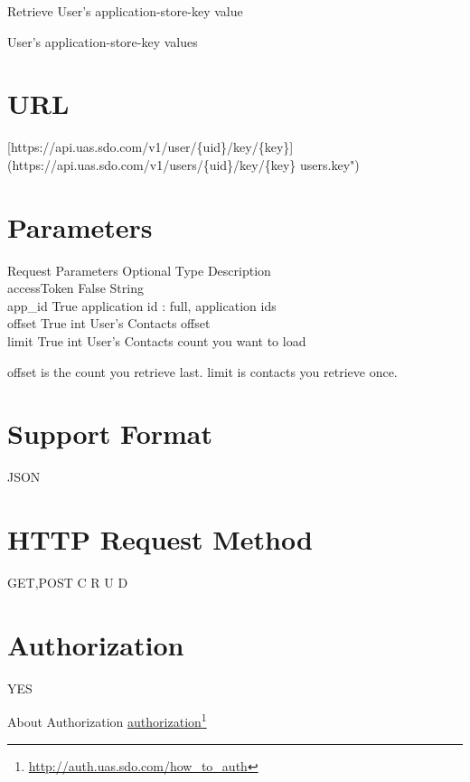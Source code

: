 Retrieve User's application-store-key value

User's application-store-key values

\section{URL}
\label{url}

[https:/\slash api.uas.sdo.com\slash v1\slash user\slash \{uid\}\slash key\slash \{key\}](https:/\slash api.uas.sdo.com\slash v1\slash users\slash \{uid\}\slash key\slash \{key\} users.key")

\section{Parameters}
\label{parameters}

Request Parameters \textbar{} Optional \textbar{} Type \textbar{} Description\\
accessToken \textbar{} False \textbar{} String\textbar{}\\
app\_id \textbar{} True \textbar{} application id : full, application ids\\
offset \textbar{} True \textbar{} int \textbar{} User's Contacts offset\\
limit \textbar{} True \textbar{} int \textbar{} User's Contacts count you want to load 

offset is the count you retrieve last.
limit is contacts you retrieve once.

\section{Support Format}
\label{supportformat}

JSON

\section{HTTP Request Method}
\label{httprequestmethod}

GET,POST
C
R
U
D

\section{Authorization}
\label{authorization}

YES

About Authorization \href{http://auth.uas.sdo.com/how_to_auth}{authorization}\footnote{\href{http://auth.uas.sdo.com/how_to_auth}{http:/\slash auth.uas.sdo.com\slash how\_to\_auth}}


